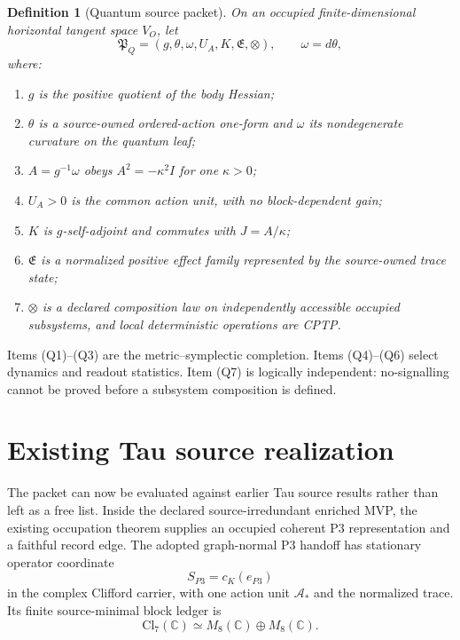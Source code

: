\documentclass[11pt]{article}
\newtheorem{definition}{Definition}
\begin{document}
\begin{definition}[Quantum source packet]
On an occupied finite-dimensional horizontal tangent space $V_O$, let
\begin{equation}
 \mathfrak P_Q=(g,\theta,\omega,U_A,K,\mathfrak E,\otimes),
 \qquad \omega=d\theta,
 \label{eq:packet}
\end{equation}
where:
\begin{enumerate}[label=(Q\arabic*)]
\item $g$ is the positive quotient of the body Hessian;
\item $\theta$ is a source-owned ordered-action one-form and $\omega$ its
nondegenerate curvature on the quantum leaf;
\item $A=g^{-1}\omega$ obeys $A^2=-\kappa^2 I$ for one $\kappa>0$;
\item $U_A>0$ is the common action unit, with no block-dependent gain;
\item $K$ is $g$-self-adjoint and commutes with $J=A/\kappa$;
\item $\mathfrak E$ is a normalized positive effect family represented by the
source-owned trace state;
\item $\otimes$ is a declared composition law on independently accessible
occupied subsystems, and local deterministic operations are CPTP.
\end{enumerate}
\end{definition}

Items (Q1)--(Q3) are the metric--symplectic completion.  Items (Q4)--(Q6)
select dynamics and readout statistics.  Item (Q7) is logically independent:
no-signalling cannot be proved before a subsystem composition is defined.

\section{Existing Tau source realization}

The packet can now be evaluated against earlier Tau source results rather
than left as a free list.  Inside the declared source-irredundant enriched
MVP, the existing occupation theorem supplies an occupied coherent P3
representation and a faithful record edge.  The adopted graph-normal P3
handoff has stationary operator coordinate
\begin{equation}
 S_{P3}=c_K(e_{P3})
\end{equation}
in the complex Clifford carrier, with one action unit $\mathcal A_*$ and the
normalized trace.  Its finite source-minimal block ledger is
\begin{equation}
 \mathrm{Cl}_7(\mathbb C)\simeq
 M_8(\mathbb C)\oplus M_8(\mathbb C).
 \label{eq:cl7}
\end{equation}
\end{document}
